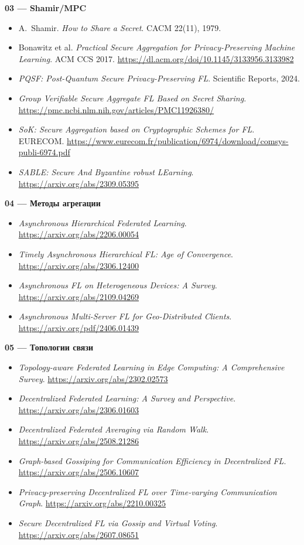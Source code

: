 \documentclass[11pt]{article}
\begin{document}
\textbf{03 --- Shamir/MPC}
\begin{itemize}[leftmargin=1.3cm]
  \item A.~Shamir. \emph{How to Share a Secret}. CACM 22(11), 1979.
  \item Bonawitz et al. \emph{Practical Secure Aggregation for
        Privacy-Preserving Machine Learning}. ACM CCS 2017.
        \url{https://dl.acm.org/doi/10.1145/3133956.3133982}
  \item \emph{PQSF: Post-Quantum Secure Privacy-Preserving FL}. Scientific
        Reports, 2024.
  \item \emph{Group Verifiable Secure Aggregate FL Based on Secret Sharing}.
        \url{https://pmc.ncbi.nlm.nih.gov/articles/PMC11926380/}
  \item \emph{SoK: Secure Aggregation based on Cryptographic Schemes for FL}.
        EURECOM.
        \url{https://www.eurecom.fr/publication/6974/download/comsys-publi-6974.pdf}
  \item \emph{SABLE: Secure And Byzantine robust LEarning}.
        \url{https://arxiv.org/abs/2309.05395}
\end{itemize}

\textbf{04 --- Методы агрегации}
\begin{itemize}[leftmargin=1.3cm]
  \item \emph{Asynchronous Hierarchical Federated Learning}.
        \url{https://arxiv.org/abs/2206.00054}
  \item \emph{Timely Asynchronous Hierarchical FL: Age of Convergence}.
        \url{https://arxiv.org/abs/2306.12400}
  \item \emph{Asynchronous FL on Heterogeneous Devices: A Survey}.
        \url{https://arxiv.org/abs/2109.04269}
  \item \emph{Asynchronous Multi-Server FL for Geo-Distributed Clients}.
        \url{https://arxiv.org/pdf/2406.01439}
\end{itemize}

\textbf{05 --- Топологии связи}
\begin{itemize}[leftmargin=1.3cm]
  \item \emph{Topology-aware Federated Learning in Edge Computing: A
        Comprehensive Survey}. \url{https://arxiv.org/abs/2302.02573}
  \item \emph{Decentralized Federated Learning: A Survey and Perspective}.
        \url{https://arxiv.org/abs/2306.01603}
  \item \emph{Decentralized Federated Averaging via Random Walk}.
        \url{https://arxiv.org/abs/2508.21286}
  \item \emph{Graph-based Gossiping for Communication Efficiency in
        Decentralized FL}. \url{https://arxiv.org/abs/2506.10607}
  \item \emph{Privacy-preserving Decentralized FL over Time-varying
        Communication Graph}. \url{https://arxiv.org/abs/2210.00325}
  \item \emph{Secure Decentralized FL via Gossip and Virtual Voting}.
        \url{https://arxiv.org/abs/2607.08651}
\end{itemize}
\end{document}
